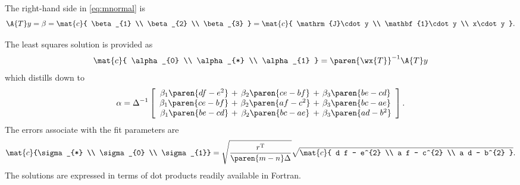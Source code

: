 The right-hand side in \eqref{eq:mnormal} is
\begin{equation*}
    \A{T}y = \beta = 
      \mat{c}{ \beta_{1} \\ \beta_{2} \\ \beta_{3} } = 
      \mat{c}{ \mathrm{J}\cdot y \\ \mathbf{1}\cdot y \\ x\cdot y } .
    \label{eq:rhs}
\end{equation*}

The least squares solution is provided as
\begin{equation*}
    \mat{c}{ \alpha_{0} \\ \alpha_{*} \\ \alpha_{1} } = \paren{\wx{T}}^{-1} \A{T}y 
    \label{eq:soln3}
\end{equation*}
which distills down to
\begin{equation*}
    \alpha = \Delta^{-1} 
    \left[
    \begin{array}{r@{ + }c@{ + }l}
      \beta_{1} \paren{d f -  e^{2}} \phantom{i} &  \phantom{i} \beta_{2} \paren{c e - b f} \phantom{i}   & \phantom{i} \beta_{3} \paren{b e - c d} \\
      \beta_{1} \paren{c e - b f} \phantom{i}    &  \phantom{i} \beta_{2} \paren{a f - c^{2}} \phantom{i} & \phantom{i} \beta_{3} \paren{b c - a e} \\
      \beta_{1} \paren{b e - c d} \phantom{i}    &  \phantom{i} \beta_{2} \paren{b c - a  e} \phantom{i}  & \phantom{i} \beta_{3} \paren{a d - b^{2}}
    \end{array}
    \right] .
    \label{eq:error3}
\end{equation*}
The errors associate with the fit parameters are
  \begin{equation*}
    \mat{c}{\sigma_{*} \\ \sigma_{0} \\ \sigma_{1}} = \sqrt{\frac{r^{\mathrm{T}}}{\paren{m-n}\Delta}}
    \sqrt{\mat{c}{ d f - e^{2} \\ a f - c^{2} \\ a d - b^{2} }} .
    \label{eq:errors2}
  \end{equation*}
The solutions are expressed in terms of dot products readily available in Fortran.


